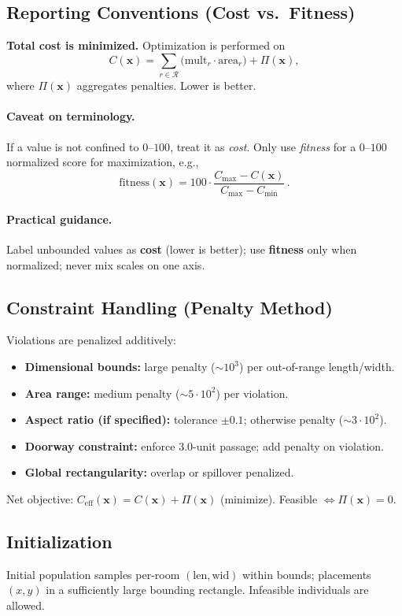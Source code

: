 \documentclass{article}
\begin{document}
\subsection{Reporting Conventions (Cost vs.\ Fitness)}
\textbf{Total cost is minimized.} Optimization is performed on
\[
C(\mathbf{x}) = \sum_{r \in \mathcal{R}} \big(\text{mult}_r \cdot \text{area}_r \big) + \Pi(\mathbf{x}),
\]
where $\Pi(\mathbf{x})$ aggregates penalties. Lower is better.

\paragraph{Caveat on terminology.}
If a value is not confined to $0$--$100$, treat it as \emph{cost}. Only use \emph{fitness} for a $0$--$100$ normalized score for maximization, e.g.,
\[
\mathrm{fitness}(\mathbf{x}) = 100 \cdot \frac{C_{\max} - C(\mathbf{x})}{C_{\max} - C_{\min}}\,.
\]

\paragraph{Practical guidance.}
Label unbounded values as \textbf{cost} (lower is better); use \textbf{fitness} only when normalized; never mix scales on one axis.

\subsection{Constraint Handling (Penalty Method)}\label{sec:penalties}
Violations are penalized additively:
\begin{itemize}
    \item \textbf{Dimensional bounds:} large penalty ($\sim10^3$) per out-of-range length/width.
    \item \textbf{Area range:} medium penalty ($\sim5\cdot10^2$) per violation.
    \item \textbf{Aspect ratio (if specified):} tolerance $\pm0.1$; otherwise penalty ($\sim3\cdot10^2$).
    \item \textbf{Doorway constraint:} enforce $3.0$-unit passage; add penalty on violation.
    \item \textbf{Global rectangularity:} overlap or spillover penalized.
\end{itemize}
Net objective: $C_{\mathrm{eff}}(\mathbf{x}) = C(\mathbf{x}) + \Pi(\mathbf{x})$ (minimize). Feasible $\Leftrightarrow \Pi(\mathbf{x})=0$.

\subsection{Initialization}
Initial population samples per-room $(\text{len},\text{wid})$ within bounds; placements $(x,y)$ in a sufficiently large bounding rectangle. Infeasible individuals are allowed.
\end{document}
